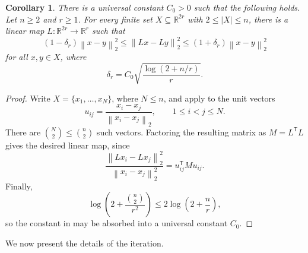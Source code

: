 \documentclass[11pt,reqno,letterpaper]{amsart}
\newtheorem{corollary}[corollary]{Corollary}
\newcommand{\R}{\mathbb R}
\newcommand{\norm}[1]{\left\lVert #1\right\rVert_2}
\newcommand{\abs}[1]{\left\lvert #1\right\rvert}
\begin{document}
\begin{corollary}\label{cor:one-step}
There is a universal constant $C_0>0$ such that the following holds.
Let $n\geq2$ and $r\geq1$. For every finite set
$X\subseteq\R^{2r}$ with $2\leq\abs{X}\leq n$, there is a linear map
$L:\R^{2r}\to\R^r$ such that
\[
 (1-\delta_r)\norm{x-y}^2
 \leq
 \norm{Lx-Ly}^2
 \leq
 (1+\delta_r)\norm{x-y}^2
\]
for all $x,y\in X$, where
\[
 \delta_r
 =
 C_0\sqrt{\frac{\log(2+n/r)}{r}}.
\]
\end{corollary}

\begin{proof}
Write $X=\{x_1,\ldots,x_N\}$, where $N\leq n$, and apply
 to the unit vectors
\[
 u_{ij}
 =
 \frac{x_i-x_j}{\norm{x_i-x_j}},
 \qquad 1\leq i<j\leq N.
\]
There are $\binom N2\leq\binom n2$ such vectors. Factoring the resulting
matrix as $M=L^{\mathsf T}L$ gives the desired linear map, since
\[
 \frac{\norm{Lx_i-Lx_j}^2}{\norm{x_i-x_j}^2}
 =
 u_{ij}^{\mathsf T}Mu_{ij}.
\]
Finally,
\[
 \log\left(2+\frac{\binom n2}{r^2}\right)
 \leq
 2\log\left(2+\frac nr\right),
\]
so the constant in  may be absorbed into a universal
constant $C_0$.
\end{proof}


We now present the details of the iteration. 
\end{document}
